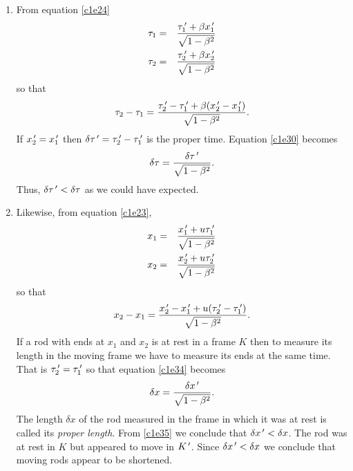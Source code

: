 \begin{enumerate}
\item From equation \eqref{c1e24}
\begin{eqnarray}
\tau_1 &=& \frac{\tau_1^{\,\prime} + \beta x_1^{\,\prime}}{\sqrt{1 - \beta^2}} \label{c1e28} \\
\tau_2 &=& \frac{\tau_2^{\,\prime} + \beta x_2^{\,\prime}}{\sqrt{1 - \beta^2}} \label{c1e29}
\end{eqnarray}
so that
\begin{equation}\label{c1e30}
\tau_2 - \tau_1 = \frac{\tau_2^{\,\prime} - \tau_1^{\,\prime} + \beta(x_2^{\,\prime} - x_1^{\,\prime})}{\sqrt{1 - \beta^2}}.
\end{equation}
If $x_2^{\,\prime} = x_1^{\,\prime}$ then $\delta\tau^{\,\prime} = \tau_2^{\,\prime} - \tau_1^{\,\prime}$ is the 
proper time. Equation \eqref{c1e30} becomes
\begin{equation}\label{c1e31}
\delta\tau = \frac{\delta\tau^{\,\prime}}{\sqrt{1 - \beta^2}}.
\end{equation}
Thus, $\delta\tau^{\,\prime} < \delta\tau$ as we could have expected.

\item Likewise, from equation \eqref{c1e23},
\begin{eqnarray}
x_1 &=& \frac{x^{\,\prime}_1 + u\tau^{\,\prime}_1}{\sqrt{1 - \beta^2}} \label{c1e32} \\
x_2 &=& \frac{x^{\,\prime}_2 + u\tau^{\,\prime}_2}{\sqrt{1 - \beta^2}} \label{c1e33}
\end{eqnarray}
so that
\begin{equation}\label{c1e34}
x_2 - x_1 = \frac{x^{\,\prime}_2 - x^{\,\prime}_1 + u(\tau^{\,\prime}_2 - \tau^{\,\prime}_1)}{\sqrt{1 - \beta^2}}.
\end{equation}
If a rod with ends at $x_1$ and $x_2$ is at rest in a frame $K$ then to
measure its length in the moving frame we have to measure its ends at the same
time. That is $\tau^{\,\prime}_2 = \tau^{\,\prime}_1$ so that equation \eqref{c1e34} becomes
\begin{equation}\label{c1e35}
\delta x = \frac{\delta x^{\,\prime}}{\sqrt{1 - \beta^2}}.
\end{equation}
The length $\delta x$ of the rod measured in the frame in which it was at rest
is called its \emph{proper length}. From \eqref{c1e35} we conclude that $\delta x^{\,\prime}
< \delta x$. The rod was at rest in $K$ but appeared to move in $K^{\,\prime}$. Since
$\delta x^{\,\prime} < \delta x$ we conclude that moving rods appear to be shortened.


\end{enumerate}
